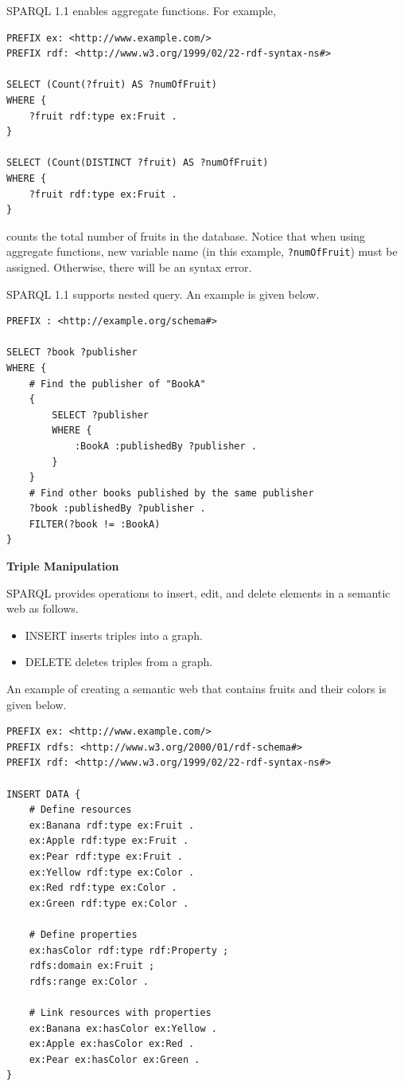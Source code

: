 SPARQL 1.1 enables aggregate functions. For example,
\begin{lstlisting}
PREFIX ex: <http://www.example.com/>
PREFIX rdf: <http://www.w3.org/1999/02/22-rdf-syntax-ns#>

SELECT (Count(?fruit) AS ?numOfFruit)
WHERE {
	?fruit rdf:type ex:Fruit .
}

SELECT (Count(DISTINCT ?fruit) AS ?numOfFruit)
WHERE {
	?fruit rdf:type ex:Fruit .
}
\end{lstlisting}
counts the total number of fruits in the database. Notice that when using aggregate functions, new variable name (in this example, \verb|?numOfFruit|) must be assigned. Otherwise, there will be an syntax error.

SPARQL 1.1 supports nested query. An example is given below.
\begin{lstlisting}
PREFIX : <http://example.org/schema#>

SELECT ?book ?publisher
WHERE {
	# Find the publisher of "BookA"
	{
		SELECT ?publisher
		WHERE {
			:BookA :publishedBy ?publisher .
		}
	}
	# Find other books published by the same publisher
	?book :publishedBy ?publisher .
	FILTER(?book != :BookA)
}
\end{lstlisting}

\vspace{0.1in}
\noindent \textbf{Triple Manipulation}
\vspace{0.1in}

SPARQL provides operations to insert, edit, and delete elements in a semantic web as follows.
\begin{itemize}
	\item INSERT inserts triples into a graph.
	\item DELETE deletes triples from a graph.
\end{itemize}

An example of creating a semantic web that contains fruits and their colors is given below.
\begin{lstlisting}
PREFIX ex: <http://www.example.com/>
PREFIX rdfs: <http://www.w3.org/2000/01/rdf-schema#>
PREFIX rdf: <http://www.w3.org/1999/02/22-rdf-syntax-ns#>

INSERT DATA {
	# Define resources
	ex:Banana rdf:type ex:Fruit .
	ex:Apple rdf:type ex:Fruit .
	ex:Pear rdf:type ex:Fruit .
	ex:Yellow rdf:type ex:Color .
	ex:Red rdf:type ex:Color .
	ex:Green rdf:type ex:Color .
	
	# Define properties
	ex:hasColor rdf:type rdf:Property ;
	rdfs:domain ex:Fruit ;
	rdfs:range ex:Color .
	
	# Link resources with properties
	ex:Banana ex:hasColor ex:Yellow .
	ex:Apple ex:hasColor ex:Red .
	ex:Pear ex:hasColor ex:Green .
}
\end{lstlisting}

